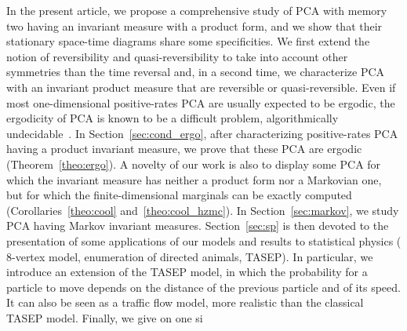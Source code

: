 \documentclass[10pt]{amsart}
\theoremstyle{definition}\newtheorem{defi}[theo]{Definition}\newtheorem{rema}[theo]{Remark}\newtheorem{exam}[theo]{Example}\newtheorem{exem}[theo]{Example}\newtheorem{nota}[theo]{Notation}
\newcounter{a}
\begin{document}
In the present article, we propose a comprehensive study of PCA with memory two having an invariant measure with a product form, and we show that their stationary space-time diagrams share some specificities. We first extend the notion of reversibility and quasi-reversibility to take into account other symmetries than the time reversal and, in a second time, we characterize PCA with an invariant product measure that are reversible or quasi-reversible. Even if most one-dimensional positive-rates PCA are usually expected to be ergodic, the ergodicity of PCA is known to be a difficult problem, algorithmically undecidable~\cite{bmm_aap,dobrushin}. In Section~\ref{sec:cond_ergo}, after characterizing positive-rates PCA having a product invariant measure, we prove that these PCA are ergodic (Theorem~\ref{theo:ergo}). A novelty of our work is also to display some PCA for which the invariant measure has neither a product form nor a Markovian one, but for which the finite-dimensional marginals can be exactly computed (Corollaries~\ref{theo:cool} and~\ref{theo:cool_hzmc}). In Section~\ref{sec:markov}, we study PCA having Markov invariant measures. Section~\ref{sec:sp} is then devoted to the presentation of some applications of our models and results to statistical physics ($8$-vertex model, enumeration of directed animals, TASEP). In particular, we introduce an extension of the TASEP model, in which the probability for a particle to move depends on the distance of the previous particle and of its speed. It can also be seen as a traffic flow model, more realistic than the classical TASEP model. Finally, we give on one si%
\end{document}

